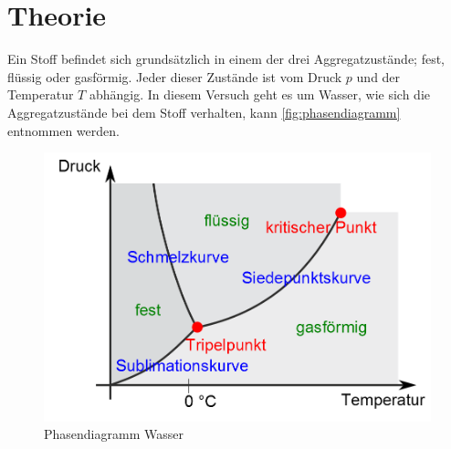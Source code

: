 \section{Theorie}
\label{sec:Theorie}

Ein Stoff befindet sich grundsätzlich in einem der drei Aggregatzustände;
fest, flüssig oder gasförmig. Jeder dieser Zustände ist vom Druck $p$ und
der Temperatur $T$ abhängig. In diesem Versuch geht es um Wasser, wie sich 
die Aggregatzustände bei dem Stoff verhalten, kann \autoref{fig:phasendiagramm}
\cite{phasendiagramm} entnommen werden. 
\begin{figure}[h]
    \centering
    \begin{minipage}{0.45\textwidth}
        \centering
        \includegraphics[width=\textwidth]{Bilder/aggregatzustand.png}
        \caption{Phasendiagramm Wasser}
    \end{minipage}
    \hfill
    \label{fig:Phasendiagramm}
\end{figure}